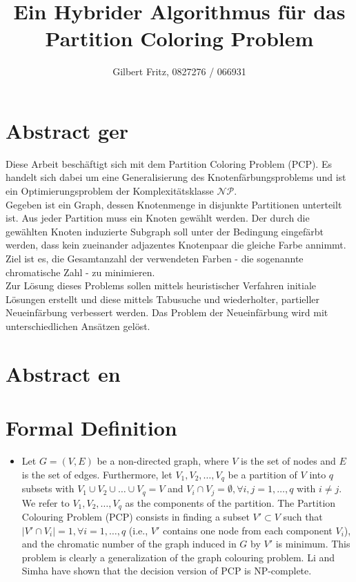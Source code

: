\documentclass{article}
\title{Ein Hybrider Algorithmus für das Partition Coloring Problem}
\author{Gilbert Fritz, 0827276 / 066931}
\begin{document}
\maketitle
\nocite{li-00}

\section{Abstract ger}

Diese Arbeit beschäftigt sich mit dem Partition Coloring Problem (PCP). Es handelt sich dabei um eine Generalisierung des Knotenfärbungsproblems und ist ein Optimierungsproblem der Komplexitätsklasse $\mathcal{NP}$.\\
Gegeben ist ein Graph, dessen Knotenmenge in disjunkte Partitionen unterteilt ist. Aus jeder Partition muss ein Knoten gewählt werden. Der durch die gewählten Knoten induzierte Subgraph soll unter der Bedingung eingefärbt werden, dass kein zueinander adjazentes Knotenpaar die gleiche Farbe annimmt. Ziel ist es, die Gesamtanzahl der verwendeten Farben - die sogenannte chromatische Zahl - zu minimieren.\\
Zur Lösung dieses Problems sollen mittels heuristischer Verfahren initiale Lösun\-gen erstellt und diese mittels Tabusuche und wiederholter, partieller Neueinfär\-bung verbessert werden. Das Problem der Neueinfärbung wird mit unterschiedlichen Ansätzen gelöst. 

\section{Abstract en}

\section{Formal Definition}
\begin{itemize}

\item Let $G = (V, E)$ be a non-directed graph, where
$V$ is the set of nodes and $E$ is the set of edges. Furthermore,
let $V_1, V_2,\ldots, V_q$ be a partition of $V$ into
$q$ subsets with $V_1 \cup V_2 \cup \ldots \cup V_q = V$ and
$V_i \cap V_j = \emptyset, \forall i, j = 1, \ldots , q$ with $i \neq j$. We refer
to $V_1, V_2, \ldots , V_q$ as the components of the partition. The Partition Colouring Problem (PCP)
consists in finding a subset $V' \subset V$ such that
$|V' \cap V_i| = 1, \forall i = 1, \ldots , q$ (i.e., $V'$ contains one
node from each component $V_i$), and the chromatic
number of the graph induced in $G$ by $V'$ is minimum. This problem is clearly a generalization of
the graph colouring problem. Li and Simha \cite{li-00}	
have shown that the decision version of PCP is
NP-complete.
\end{itemize}
\end{document}
